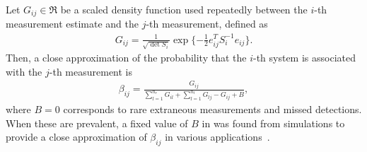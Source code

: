 Let $G_{ij}\in\Re$ be a scaled density function used repeatedly between the $i$-th measurement estimate and the $j$-th measurement, defined as
\begin{align}
G_{ij}=\frac1{\sqrt{\det{S_{i}}}}\exp{\{-\frac12e_{ij}^TS_{i}^{-1}e_{ij}\}}.
\end{align}
Then, a close approximation of the probability that the $i$-th system is associated with the $j$-th measurement is
\begin{align}
\label{eqn:betaDef}
\beta_{ij}=\frac{G_{ij}}{\sum\limits_{l=1}^{n_r}G_{il}+\sum\limits_{l=1}^{n_t}G_{lj}-G_{ij}+B},
\end{align}
where $B=0$ corresponds to rare extraneous measurements and missed detections. When these are prevalent, a fixed value of $B$ in  was found from simulations to provide a close approximation of $\beta_{ij}$ in various applications~\cite{Bar1990}.










